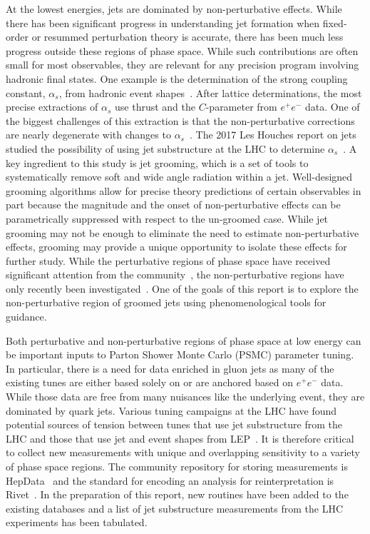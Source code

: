 \documentclass[11pt]{cernrep}
\begin{document}
At the lowest energies, jets are dominated by non-perturbative effects.  While there has been significant progress in understanding jet formation when fixed-order or resummed perturbation theory is accurate, there has been much less progress outside these regions of phase space.  While such contributions are often small for most observables, they are relevant for any precision program involving hadronic final states.  One example is the determination of the strong coupling constant, $\alpha_s$, from hadronic event shapes~\cite{Abbate:2010xh,Hoang:2015hka,TheALEPHCollaboration2004,DELPHICollaboration1997,Abdallah:2004xe,Biebel:1999zt,Abbiendi:2004qz,Buskulic:1992hq}.   After lattice determinations, the most precise extractions of $\alpha_s$ use thrust and the $C$-parameter from $e^+e^-$ data.  One of the biggest challenges of this extraction is that the non-perturbative corrections are nearly degenerate with changes to $\alpha_s$~\cite{Abbate:2010xh}.  The 2017 Les Houches report on jets studied the possibility of using jet substructure at the LHC to determine $\alpha_s$~\cite{Bendavid:2018nar}.  A key ingredient to this study is jet grooming, which is a set of tools to systematically remove soft and wide angle radiation within a jet.  Well-designed grooming algorithms allow for precise theory predictions of certain observables in part because the magnitude and the onset of non-perturbative effects can be parametrically suppressed with respect to the un-groomed case.  While jet grooming may not be enough to eliminate the need to estimate non-perturbative effects, grooming may provide a unique opportunity to isolate these effects for further study.   While the perturbative regions of phase space have received significant attention from the community~\cite{Frye:2016aiz,Frye:2016okc,Marzani:2017mva,Marzani:2017kqd,Kang:2018vgn,Kang:2018jwa,Baron:2018nfz,Kardos:2018kth}, the non-perturbative regions have only recently been investigated~\cite{Hoang:2019ceu}.   One of the goals of this report is to explore the non-perturbative region of groomed jets using phenomenological tools for guidance. 

Both perturbative and non-perturbative regions of phase space at low energy can be important inputs to Parton Shower Monte Carlo (PSMC) parameter tuning.  In particular, there is a need for data enriched in gluon jets as many of the existing tunes are either based solely on or are anchored based on $e^+e^-$ data.  While those data are free from many nuisances like the underlying event, they are dominated by quark jets.  Various tuning campaigns at the LHC have found potential sources of tension between tunes that use jet substructure from the LHC and those that use jet and event shapes from LEP~\cite{ATL-PHYS-PUB-2014-021,Aad:2016oit}.  It is therefore critical to collect new measurements with unique and overlapping sensitivity to a variety of phase space regions.  The community repository for storing measurements is HepData~\cite{Buckley:2010jn,Maguire:2017ypu} and the standard for encoding an analysis for reinterpretation is Rivet~\cite{Buckley:2010ar}.  In the preparation of this report, new routines have been added to the existing databases and a list of jet substructure measurements from the LHC experiments has been tabulated.
\end{document}
